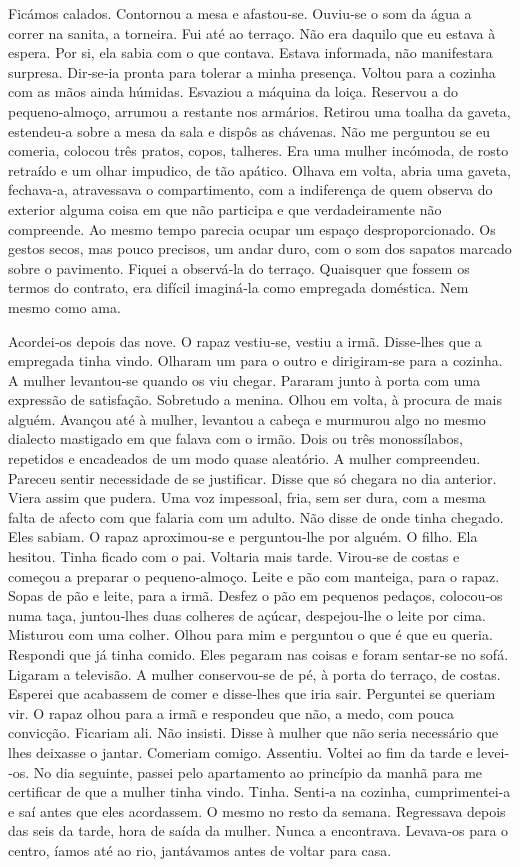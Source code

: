 Ficámos calados. Contornou a mesa e afastou­‑se. Ouviu­‑se o som da água
a correr na sanita, a torneira. Fui até ao terraço. Não era daquilo que
eu estava à espera. Por si, ela sabia com o que contava. Estava
informada, não manifestara surpresa. Dir­‑se­‑ia pronta para tolerar a
minha presença. Voltou para a cozinha com as mãos ainda húmidas.
Esvaziou a máquina da loiça. Reservou a do pequeno­‑almoço, arrumou a
restante nos armários. Retirou uma toalha da gaveta, estendeu­‑a sobre a
mesa da sala e dispôs as chávenas. Não me perguntou se eu comeria,
colocou três pratos, copos, talheres. Era uma mulher incómoda, de rosto
retraído e um olhar impudico, de tão apático. Olhava em volta, abria uma
gaveta, fechava­‑a, atravessava o compartimento, com a indiferença de
quem observa do exterior alguma coisa em que não participa e que
verdadeiramente não compreende. Ao mesmo tempo parecia ocupar um espaço
desproporcionado. Os gestos secos, mas pouco precisos, um andar duro,
com o som dos sapatos marcado sobre o pavimento. Fiquei a observá­‑la do
terraço. Quaisquer que fossem os termos do contrato, era difícil
imaginá­‑la como empregada doméstica. Nem mesmo como ama.

Acordei­‑os depois das nove. O rapaz vestiu­‑se, vestiu a irmã.
Disse­‑lhes que a empregada tinha vindo. Olharam um para o outro e
dirigiram­‑se para a cozinha. A mulher levantou­‑se quando os viu
chegar. Pararam junto à porta com uma expressão de satisfação. Sobretudo
a menina. Olhou em volta, à procura de mais alguém. Avançou até à
mulher, levantou a cabeça e murmurou algo no mesmo dialecto mastigado em
que falava com o irmão. Dois ou três monossílabos, repetidos e
encadeados de um modo quase aleatório. A mulher compreendeu. Pareceu
sentir necessidade de se justificar. Disse que só chegara no dia
anterior. Viera assim que pudera. Uma voz impessoal, fria, sem ser dura,
com a mesma falta de afecto com que falaria com um adulto. Não disse de
onde tinha chegado. Eles sabiam. O rapaz aproximou­‑se e perguntou­‑lhe
por alguém. O filho. Ela hesitou. Tinha ficado com o pai. Voltaria mais
tarde. Virou­‑se de costas e começou a preparar o pequeno­‑almoço. Leite
e pão com manteiga, para o rapaz. Sopas de pão e leite, para a irmã.
Desfez o pão em pequenos pedaços, colocou­‑os numa taça, juntou­‑lhes
duas colheres de açúcar, despejou­‑lhe o leite por cima. Misturou com
uma colher. Olhou para mim e perguntou o que é que eu queria. Respondi
que já tinha comido. Eles pegaram nas coisas e foram sentar­‑se no sofá.
Ligaram a televisão. A mulher conservou­‑se de pé, à porta do terraço,
de costas. Esperei que acabassem de comer e disse­‑lhes que iria sair.
Perguntei se queriam vir. O rapaz olhou para a irmã e respondeu que não,
a medo, com pouca convicção. Ficariam ali. Não insisti. Disse à mulher
que não seria necessário que lhes deixasse o jantar. Comeriam comigo.
Assentiu. Voltei ao fim da tarde e levei­‑os. No dia seguinte, passei
pelo apartamento ao princípio da manhã para me certificar de que a
mulher tinha vindo. Tinha. Senti­‑a na cozinha, cumprimentei­‑a e saí
antes que eles acordassem. O mesmo no resto da semana. Regressava depois
das seis da tarde, hora de saída da mulher. Nunca a encontrava.
Levava­‑os para o centro, íamos até ao rio, jantávamos antes de voltar
para casa.

